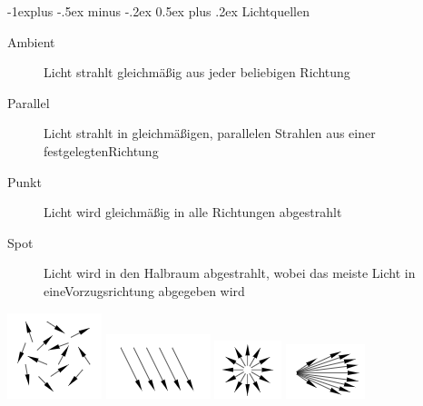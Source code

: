 \documentclass[landscape]{article}
\makeatletter
\renewcommand{\subsection}{\@startsection{subsection}{2}{0mm}%
                                {-1explus -.5ex minus -.2ex}%
                                {0.5ex plus .2ex}%
                                {\normalfont\normalsize\bfseries}}
\makeatother
\begin{document}
\begin{multicols}{3}
  \subsection{Lichtquellen}
  \begin{description}
    \item[Ambient] Licht strahlt gleichmäßig aus jeder beliebigen Richtung
    \item[Parallel] Licht strahlt in gleichmäßigen, parallelen Strahlen aus einer festgelegtenRichtung
    \item[Punkt] Licht  wird  gleichmäßig  in  alle  Richtungen  abgestrahlt
    \item[Spot] Licht wird in den Halbraum abgestrahlt, wobei das meiste Licht in eineVorzugsrichtung abgegeben wird
  \end{description}
  \begin{center}
    \includegraphics[width=0.15\linewidth]{Assets/Computergrafik_ambientes-licht}
    \includegraphics[width=0.15\linewidth]{Assets/Computergrafik_paralleles-licht}
    \includegraphics[width=0.15\linewidth]{Assets/Computergrafik_punkt-licht}
    \includegraphics[width=0.15\linewidth]{Assets/Computergrafik_spot-licht}
  \end{center}
  

\end{multicols}
\end{document}
